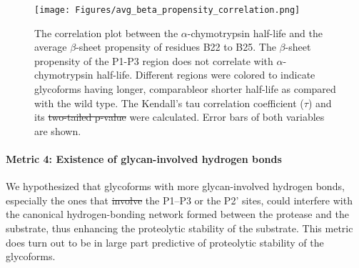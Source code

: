 \documentclass[9pt]{elife}
\providecommand{\DIFaddtex}[1]{{\protect\color{blue}\uwave{#1}}} %
\providecommand{\DIFdeltex}[1]{{\protect\color{red}\sout{#1}}}                      %
\providecommand{\DIFaddbegin}{} %
\providecommand{\DIFaddend}{} %
\providecommand{\DIFdelbegin}{} %
\providecommand{\DIFdelend}{} %
\providecommand{\DIFaddFL}[1]{\DIFadd{#1}} %
\providecommand{\DIFdelFL}[1]{\DIFdel{#1}} %
\providecommand{\DIFaddbeginFL}{} %
\providecommand{\DIFaddendFL}{} %
\providecommand{\DIFdelbeginFL}{} %
\providecommand{\DIFdelendFL}{} %
\providecommand{\DIFadd}[1]{\texorpdfstring{\DIFaddtex{#1}}{#1}} %
\providecommand{\DIFdel}[1]{\texorpdfstring{\DIFdeltex{#1}}{}} %
\begin{document}
\begin{figure}[H]
\centering
\texttt{[image: Figures/avg\_beta\_propensity\_correlation.png]}
\caption{The correlation plot between the $\alpha$-chymotrypsin half-life and the average $\beta$-sheet propensity of residues B22 to B25. The $\beta$-sheet propensity of the P1-P3 region does not correlate with $\alpha$-chymotrypsin half-life. Different regions were colored to indicate glycoforms having longer, comparable\DIFaddbeginFL \DIFaddFL{, }\DIFaddendFL or shorter half-life as compared with the wild type. The Kendall's tau correlation coefficient ($\tau$) and its \DIFdelbeginFL \DIFdelFL{two-tailed p-value }\DIFdelendFL \DIFaddbeginFL \DIFaddFL{uncertainty }\DIFaddendFL were calculated. Error bars of both variables are shown.}
\label{result_beta}
\end{figure}

\paragraph{Metric 4: Existence of glycan-involved hydrogen bonds}
We hypothesized that glycoforms with more glycan-involved hydrogen bonds, especially the ones that \DIFdelbegin \DIFdel{involve }\DIFdelend \DIFaddbegin \DIFadd{involved }\DIFaddend the P1--P3 or the P2' sites, could interfere with the canonical hydrogen-bonding network formed between the protease and the substrate, thus enhancing the proteolytic stability of the substrate. This metric does turn out to be in large part predictive of proteolytic stability of the glycoforms. 
\end{document}
